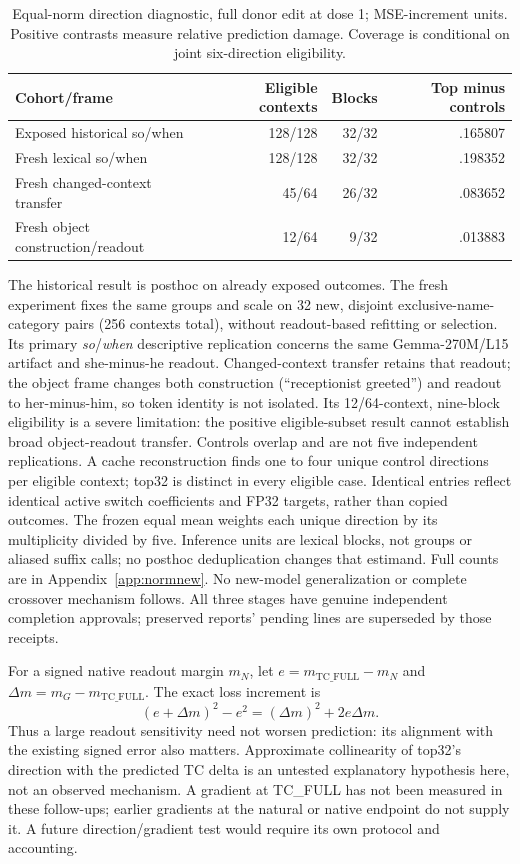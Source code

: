 \begin{table}[ht]
\centering\small
\begin{tabular}{lrrr}\toprule
Cohort/frame & Eligible contexts & Blocks & Top minus controls\\\midrule
Exposed historical so/when &128/128&32/32& .165807\\
Fresh lexical so/when &128/128&32/32& .198352\\
Fresh changed-context transfer &45/64&26/32& .083652\\
Fresh object construction/readout &12/64&9/32& .013883\\\bottomrule
\end{tabular}
\caption{Equal-norm direction diagnostic, full donor edit at dose 1; MSE-increment units. Positive contrasts measure relative prediction damage. Coverage is conditional on joint six-direction eligibility.}\label{tab:normnew}
\end{table}
The historical result is posthoc on already exposed outcomes. The fresh experiment fixes the same groups and scale on 32 new, disjoint exclusive-name-category pairs (256 contexts total), without readout-based refitting or selection. Its primary \emph{so}/\emph{when} descriptive replication concerns the same Gemma-270M/L15 artifact and she-minus-he readout. Changed-context transfer retains that readout; the object frame changes both construction (``receptionist greeted'') and readout to her-minus-him, so token identity is not isolated. Its 12/64-context, nine-block eligibility is a severe limitation: the positive eligible-subset result cannot establish broad object-readout transfer. Controls overlap and are not five independent replications. A cache reconstruction finds one to four unique control directions per eligible context; top32 is distinct in every eligible case. Identical entries reflect identical active switch coefficients and FP32 targets, rather than copied outcomes. The frozen equal mean weights each unique direction by its multiplicity divided by five. Inference units are lexical blocks, not groups or aliased suffix calls; no posthoc deduplication changes that estimand. Full counts are in Appendix~\ref{app:normnew}. No new-model generalization or complete crossover mechanism follows. All three stages have genuine independent completion approvals; preserved reports' pending lines are superseded by those receipts.

For a signed native readout margin $m_N$, let $e=m_{\mathrm{TC\_FULL}}-m_N$ and $\Delta m=m_G-m_{\mathrm{TC\_FULL}}$. The exact loss increment is
\[
 (e+\Delta m)^2-e^2=(\Delta m)^2+2e\Delta m.
\]
Thus a large readout sensitivity need not worsen prediction: its alignment with the existing signed error also matters. Approximate collinearity of top32's direction with the predicted TC delta is an untested explanatory hypothesis here, not an observed mechanism. A gradient at TC\_FULL has not been measured in these follow-ups; earlier gradients at the natural or native endpoint do not supply it. A future direction/gradient test would require its own protocol and accounting.

